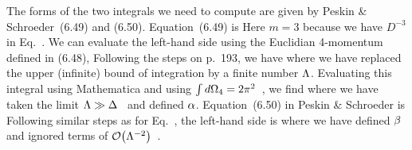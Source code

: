 {	The forms of the two integrals we need to compute are given by Peskin \& Schroeder~(6.49) and (6.50).  Equation~(6.49) is
	Here $m = 3$ because we have $D^{-3}$ in Eq.~.  We can evaluate the left-hand side using the Euclidian 4-momentum defined in (6.48),
	Following the steps on p.~193, we have
	where we have replaced the upper (infinite) bound of integration by a finite number $\Lambda$.  Evaluating this integral using Mathematica and using $\int \dd{\Omega_4} = 2 \pi^2$~\cite[p.~193]{Peskin}, we find
	where we have taken the limit $\Lambda \gg \Delta$~\cite[p.~218]{Peskin} and defined $\alpha$.  Equation~(6.50) in Peskin \& Schroeder is
	Following similar steps as for Eq.~, the left-hand side is
	where we have defined $\beta$ and ignored terms of $\order{\Lam^{-2}}$~\cite[p.~218]{Peskin}.
	
}
